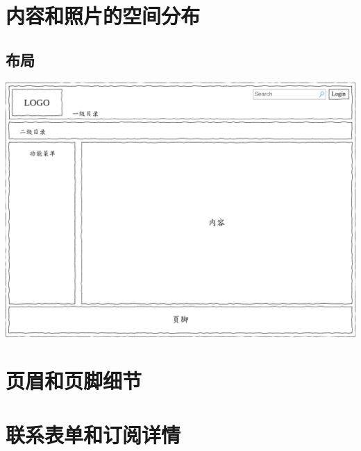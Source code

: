 \section{内容和照片的空间分布}


\subsection{布局}
\begin{center}
  \includegraphics[width=\textwidth]{images/页面布局.png}
\end{center}


\section{页眉和页脚细节}


\section{联系表单和订阅详情}